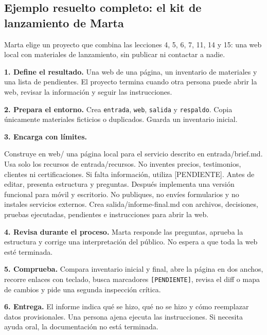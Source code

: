 \documentclass[10pt,a4paper,openany]{book}
\newenvironment{Shaded}{}{}
\newcommand{\NormalTok}[1]{#1}
\renewenvironment{Shaded}
  {\begin{tcolorbox}[
    enhanced,
    breakable,
    colback=CodeBg,
    colframe=Border,
    boxrule=0.5pt,
    arc=2mm,
    left=3mm,
    right=3mm,
    top=2.2mm,
    bottom=2.2mm,
    before skip=0.8em,
    after skip=0.9em
  ]}
  {\end{tcolorbox}}
\begin{document}
\subsection{Ejemplo resuelto completo: el kit de lanzamiento de
Marta}\label{ejemplo-resuelto-completo-el-kit-de-lanzamiento-de-marta}

Marta elige un proyecto que combina las lecciones 4, 5, 6, 7, 11, 14 y
15: una web local con materiales de lanzamiento, sin publicar ni
contactar a nadie.

\textbf{1. Define el resultado.} Una web de una página, un inventario de
materiales y una lista de pendientes. El proyecto termina cuando otra
persona puede abrir la web, revisar la información y seguir las
instrucciones.

\textbf{2. Prepara el entorno.} Crea \texttt{entrada}, \texttt{web},
\texttt{salida} y \texttt{respaldo}. Copia únicamente materiales
ficticios o duplicados. Guarda un inventario inicial.

\textbf{3. Encarga con límites.}

\begin{Shaded}
\begin{Highlighting}[]
\NormalTok{Construye en web/ una página local para el servicio descrito en entrada/brief.md.}
\NormalTok{Usa solo los recursos de entrada/recursos. No inventes precios, testimonios,}
\NormalTok{clientes ni certificaciones. Si falta información, utiliza [PENDIENTE].}
\NormalTok{Antes de editar, presenta estructura y preguntas. Después implementa una}
\NormalTok{versión funcional para móvil y escritorio. No publiques, no envíes formularios}
\NormalTok{y no instales servicios externos. Crea salida/informe{-}final.md con archivos,}
\NormalTok{decisiones, pruebas ejecutadas, pendientes e instrucciones para abrir la web.}
\end{Highlighting}
\end{Shaded}

\textbf{4. Revisa durante el proceso.} Marta responde las preguntas,
aprueba la estructura y corrige una interpretación del público. No
espera a que toda la web esté terminada.

\textbf{5. Comprueba.} Compara inventario inicial y final, abre la
página en dos anchos, recorre enlaces con teclado, busca marcadores
\texttt{{[}PENDIENTE{]}}, revisa el diff o mapa de cambios y pide una
segunda inspección crítica.

\textbf{6. Entrega.} El informe indica qué se hizo, qué no se hizo y
cómo reemplazar datos provisionales. Una persona ajena ejecuta las
instrucciones. Si necesita ayuda oral, la documentación no está
terminada.
\end{document}

